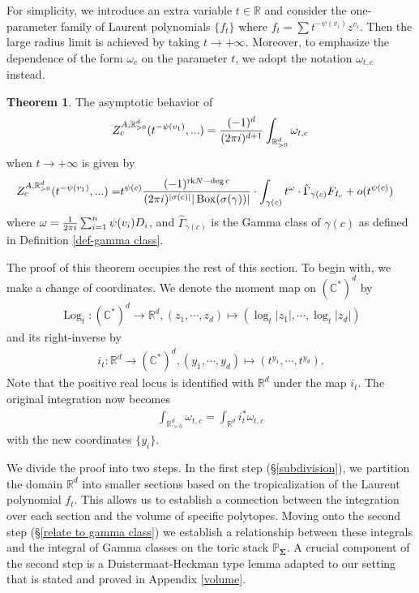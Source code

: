 \documentclass[11pt,reqno]{amsart}
\def\rk {{\operatorname{rk}}}
\def\C {{\mathbb C}}
\def\CC {{\mathbb C}}
\def\R {{\mathbb R}}
\def\PP {{\mathbb P}}
\theoremstyle{definition}
\newtheorem{theorem}{Theorem}[section]
\numberwithin{equation}{section}
\begin{document}
\smallskip

 For simplicity, we introduce an extra variable $t\in\R$ and consider the one-parameter family of Laurent polynomials $\{f_t\}$ where $f_t=\sum t^{-\psi(v_i)}z^{v_i}$. Then the large radius limit is achieved by taking $t\rightarrow +\infty$. Moreover, to emphasize the dependence of the form $\omega_c$ on the parameter $t$, we adopt the notation $\omega_{t,c}$ instead. 
 
 \smallskip

\begin{theorem}\label{asymptotics thm}
    The asymptotic behavior of
    \begin{align*}
    	Z^{A,\R_{>0}^d}_c(t^{-\psi(v_1)},...)=\frac{(-1)^d}{(2\pi{\rm i})^{d+1}}\int_{\R_{>0}^d}\omega_{t,c}
    \end{align*}
    when $t\rightarrow +\infty$ is given by
	\begin{align*}
		Z^{A,\R_{>0}^d}_c(t^{-\psi(v_1)},...)=&t^{\psi(c)}\frac{(-1)^{\rk N-\deg c}}{(2\pi{\rm i})^{|\sigma(c)|}|\operatorname{Box}(\sigma(\gamma))|}\cdot\int_{\gamma(c)} t^{\omega}\cdot \hat{\Gamma}_{\gamma(c)} F_{I_c}+o(t^{\psi(c)})
	\end{align*}
	where $\omega=\frac{1}{2\pi {\rm i}}\sum_{i=1}^n\psi(v_i)D_i$, and $\hat{\Gamma}_{\gamma(c)}$ is the Gamma class of $\gamma(c)$ as defined in Definition \ref{def-gamma class}.
\end{theorem}

\smallskip

The proof of this theorem occupies the rest of this section. To begin with, we make a change of coordinates. We denote the moment map on $(\CC^*)^d$ by
\begin{align*}
	\operatorname{Log}_t: (\C^*)^d\rightarrow \R^d, (z_1,\cdots,z_d)\mapsto (\log_t|z_1|,\cdots,\log_t|z_d|)
\end{align*}
and its right-inverse by
\begin{align*}
	i_t: \R^d\rightarrow(\C^*)^d, (y_1,\cdots, y_d)\mapsto (t^{y_1},\cdots, t^{y_d}).
\end{align*}
Note that the positive real locus is identified with $\R^d$ under the map $i_t$. The original integration now becomes 
\begin{align*}
	\int_{\R_{>0}^d}\omega_{t,c}=\int_{\R^d}i_t^*\omega_{t,c}
\end{align*}
with the new coordinates $\{y_i\}$.

\smallskip

We divide the proof into two steps. In the first step (\S\ref{subdivision}), we partition the domain $\R^d$ into smaller sections based on the tropicalization of the Laurent polynomial $f_t$. This allows us to establish a connection between the integration over each section and the volume of specific polytopes. Moving onto the second step (\S\ref{relate to gamma class}) we establish a relationship between these integrals and the integral of Gamma classes on the toric stack $\PP_{\mathbf{\Sigma}}$. A crucial component of the second step is a Duistermaat-Heckman type lemma adapted to our setting that is stated and proved in Appendix \ref{volume}. 
\end{document}
